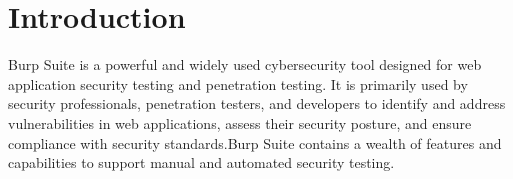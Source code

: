 \documentclass[
	a4paper, %
	12pt, %
]{CSSullivanBusinessReport}
\begin{document}
\newpage

\section*{Introduction} %
\begin{fullwidth} 
Burp Suite is a powerful and widely used cybersecurity tool designed for web application security testing and penetration testing.  It is primarily used by security professionals, penetration testers, and developers to identify and address vulnerabilities in web applications, assess their security posture, and ensure compliance with security standards.Burp Suite contains a wealth of features and capabilities to support manual and automated security testing.
\end{fullwidth}


\end{document}
